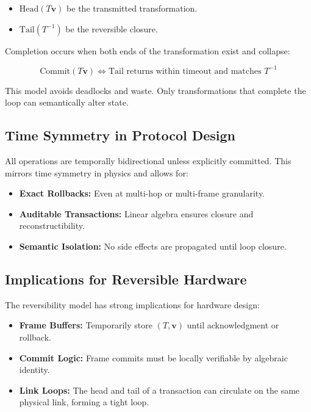 \documentclass[../../../OAE-SPEC-MAIN.tex]{subfiles}
\begin{document}
\begin{itemize}
  \item $\text{Head}(T\mathbf{v})$ be the transmitted transformation.
  \item $\text{Tail}(T^{-1})$ be the reversible closure.
\end{itemize}

Completion occurs when both ends of the transformation exist and collapse:

\[
\text{Commit}(T\mathbf{v}) \iff \text{Tail returns within timeout and matches } T^{-1}
\]

This model avoids deadlocks and waste. Only transformations that complete the loop can semantically alter state.

\subsection*{Time Symmetry in Protocol Design}

All operations are temporally bidirectional unless explicitly committed. This mirrors time symmetry in physics and allows for:

\begin{itemize}
  \item \textbf{Exact Rollbacks:} Even at multi-hop or multi-frame granularity.
  \item \textbf{Auditable Transactions:} Linear algebra ensures closure and reconstructibility.
  \item \textbf{Semantic Isolation:} No side effects are propagated until loop closure.
\end{itemize}

\subsection*{Implications for Reversible Hardware}

The reversibility model has strong implications for hardware design:

\begin{itemize}
  \item \textbf{Frame Buffers:} Temporarily store $(T, \mathbf{v})$ until acknowledgment or rollback.
  \item \textbf{Commit Logic:} Frame commits must be locally verifiable by algebraic identity.
  \item \textbf{Link Loops:} The head and tail of a transaction can circulate on the same physical link, forming a tight loop.
\end{itemize}
\end{document}
